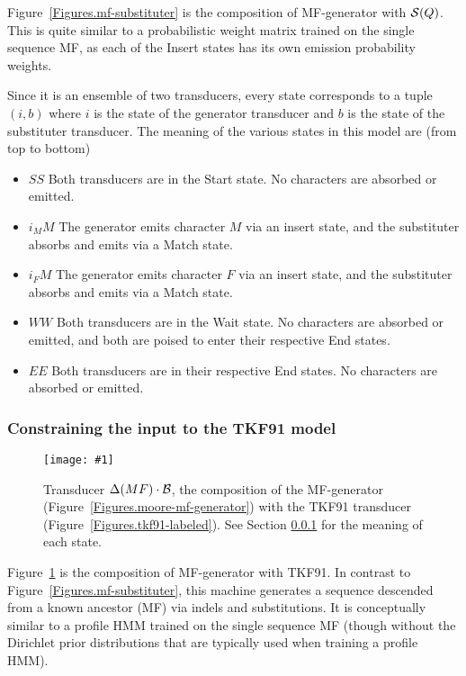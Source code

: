 \documentclass{article}
\newcommand{\figref}[1]{Figure~\ref{Figures.#1}}
\newcommand{\figlabel}[1]{\label{Figures.#1}}
\newcommand{\easyfig}[4]{
\begin{figure}
\texttt{[image: \#1]}
\caption{ \figlabel{#3} #4}
\end{figure}}
\newcommand{\tallpdffig}[2]{\easyfig{#1-fig.pdf}{height=.8\textheight}{#1}{#2}}
\newcommand\substitute{{\cal S}}
\newcommand\tkf{{\cal B}}
\newcommand\generate{\Delta}
\begin{document}
\figref{mf-substituter} is the composition of MF-generator with $\substitute(Q)$.  
This is quite similar to a probabilistic weight matrix trained on the single sequence MF,
as each of the Insert states has its own emission probability weights.

Since it is an ensemble of two transducers, every state corresponds to a tuple $(i,b)$
where
$i$ is the state of the generator transducer and
$b$ is the state of the substituter transducer.
The meaning of the various states in this model are (from top to bottom)
\begin{itemize}
\item $SS$ Both transducers are in the Start state.  No characters are  absorbed or emitted.
\item $i_MM$ The generator emits character $M$ via an insert state, and the substituter absorbs and emits via a Match state.
\item $i_FM$ The generator emits character $F$ via an insert state, and the substituter absorbs and emits via a Match state.
\item $WW$ Both transducers are in the Wait state.  No characters are  absorbed or emitted, and both are poised to enter their respective End states.
\item $EE$ Both transducers are in their respective End states. No characters are  absorbed or emitted.
\end{itemize}

\subsubsection{Constraining the input to the TKF91 model}
\label{mf-tkf91}
\tallpdffig{mf-tkf91}{Transducer $\generate(MF) \cdot \tkf$, the composition of the MF-generator (\figref{moore-mf-generator}) with the TKF91 transducer (\figref{tkf91-labeled}).  See Section \ref{mf-tkf91} for the meaning of each state. }

\figref{mf-tkf91} is the composition of MF-generator with TKF91.  
In contrast to \figref{mf-substituter}, this machine generates
a sequence descended from a known ancestor (MF) via indels and substitutions.  It is conceptually similar to a profile HMM
trained on the single sequence MF (though without the Dirichlet prior distributions that are typically used when training a profile HMM).
\end{document}

